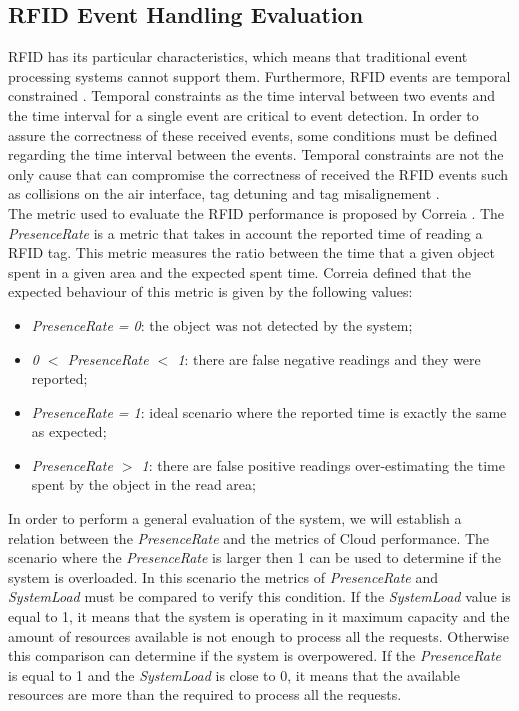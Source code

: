 \subsection{RFID Event Handling Evaluation}
\label{sub:rfid_evaluation}
RFID has its particular characteristics, which means that traditional event processing systems
cannot support them. Furthermore, RFID events are temporal constrained \cite{wang2006bridging}.
Temporal constraints as the time interval between two events and the time interval for a single
event are critical to event detection. In order to assure the correctness of these received events,
some conditions must be defined regarding the time interval between the events. Temporal constraints
are not the only cause that can compromise the correctness of received the RFID events such as
collisions on the air interface, tag detuning and tag misalignement \cite{floerkemeier2004issues}.\\

The metric used to evaluate the RFID performance is proposed by Correia \cite{Correia:Thesis:2014}.
The \textit{PresenceRate} is a metric that takes in account the reported time of reading a RFID tag.
This metric measures the ratio between the time that a given object spent in a given area and the
expected spent time. Correia \cite{Correia:Thesis:2014} defined that the expected behaviour of this
metric is given by the following values:
\begin{itemize}
  \item \textit{PresenceRate = 0}: the object was not detected by the system;
  \item \textit{0 $<$ PresenceRate $<$ 1}: there are false negative readings and they were reported;
  \item \textit{PresenceRate = 1}: ideal scenario where the reported time is exactly the same as expected;
  \item \textit{PresenceRate $>$ 1}: there are false positive readings over-estimating the time
  spent by the object in the read area;
\end{itemize}

In order to perform a general evaluation of the system, we will establish a relation
between the \textit{PresenceRate} and the metrics of Cloud performance. The scenario where
the \textit{PresenceRate} is larger then 1 can be used to determine if the system is overloaded.
In this scenario the metrics of \textit{PresenceRate} and \textit{SystemLoad} must be compared to
verify this condition. If the \textit{SystemLoad} value is equal to 1, it means that the system
is operating in it maximum capacity and the amount of resources available is not enough to
process all the requests. Otherwise this comparison can determine if the system is overpowered.
If the \textit{PresenceRate} is equal to 1 and the \textit{SystemLoad} is close to 0, it means that the
available resources are more than the required to process all the requests.
